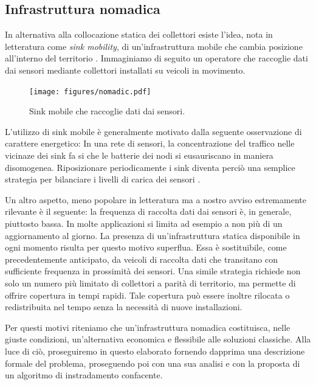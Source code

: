 \documentclass[a4paper,12pt]{article}
\theoremstyle{definition}
\begin{document}
\subsection{Infrastruttura nomadica}

In alternativa alla collocazione statica dei collettori esiste l'idea, nota in letteratura come \emph{sink mobility}, di un'infrastruttura mobile che cambia posizione all'interno del territorio \cite{sinkmob}. Immaginiamo di seguito un operatore che raccoglie dati dai sensori mediante collettori installati su veicoli in movimento.


\begin{figure}[H]
\centering
\texttt{[image: figures/nomadic.pdf]}
\caption{Sink mobile che raccoglie dati dai sensori.}
\end{figure}

L'utilizzo di sink mobile è generalmente motivato dalla seguente osservazione di carattere energetico: In una rete di sensori, la concentrazione del traffico nelle vicinaze dei sink fa si che le batterie dei nodi si eusauriscano in maniera disomogenea. Riposizionare periodicamente i sink diventa perciò una semplice strategia per bilanciare i livelli di carica dei sensori \cite{moblife1, moblife2}.

Un altro aspetto, meno popolare in letteratura ma a nostro avviso estremamente rilevante è il seguente: la frequenza di raccolta dati dai sensori è, in generale, piuttosto bassa. In molte applicazioni si limita ad esempio a non più di un aggiornamento al giorno. La presenza di un'infrastruttura statica disponibile in ogni momento risulta per questo motivo superflua. Essa è sostituibile, come precedentemente anticipato, da veicoli di raccolta dati che transitano con sufficiente frequenza in prossimità dei sensori. Una simile strategia richiede non solo un numero più limitato di collettori a parità di territorio, ma permette di offrire copertura in tempi rapidi. Tale copertura può essere inoltre rilocata o redistribuita nel tempo senza la necessità di nuove installazioni.

Per questi motivi riteniamo che un'infrastruttura nomadica costituisca, nelle giuste condizioni, un'alternativa economica e flessibile alle soluzioni classiche. Alla luce di ciò, proseguiremo in questo elaborato fornendo dapprima una descrizione formale del problema, proseguendo poi con una sua analisi e con la proposta di un algoritmo di instradamento confacente.
\end{document}
